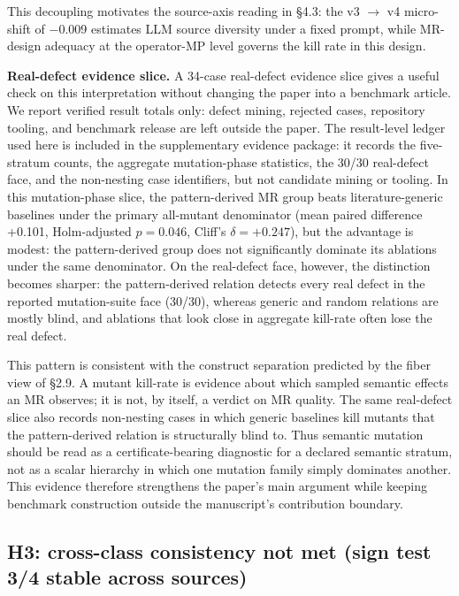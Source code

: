 \documentclass[acmsmall,screen,review]{acmart}
\begin{document}
This decoupling motivates the source-axis reading in §4.3: the v3 $\to$
v4 micro-shift of −0.009 estimates LLM source diversity under a fixed
prompt, while MR-design adequacy at the operator-MP level governs the
kill rate in this design.

\textbf{Real-defect evidence slice.} A 34-case real-defect evidence
slice gives a useful check on this interpretation without changing the
paper into a benchmark article. We report verified result totals only:
defect mining, rejected cases, repository tooling, and benchmark release
are left outside the paper. The result-level ledger used here is included
in the supplementary evidence package: it records the five-stratum counts,
the aggregate mutation-phase statistics, the 30/30 real-defect face, and
the non-nesting case identifiers, but not candidate mining or tooling. In
this mutation-phase slice, the
pattern-derived MR group beats
literature-generic baselines under the primary all-mutant denominator
(mean paired difference +0.101, Holm-adjusted \(p=0.046\), Cliff's
\(\delta=+0.247\)), but the advantage is modest: the pattern-derived
group does not significantly dominate its ablations under the same
denominator. On the real-defect face, however, the distinction becomes
sharper: the pattern-derived relation detects every real defect in the
reported mutation-suite face (30/30), whereas generic and random
relations are mostly blind, and ablations that look close in aggregate
kill-rate often lose the real defect.

This pattern is consistent with the construct separation predicted by the
fiber view of §2.9. A mutant kill-rate is evidence about which sampled
semantic effects an MR observes; it is not, by itself, a verdict on MR
quality. The same real-defect slice also records non-nesting cases in
which generic baselines kill mutants that the pattern-derived relation is
structurally blind to.
Thus semantic mutation should be read as a certificate-bearing diagnostic
for a declared semantic stratum, not as a scalar hierarchy in which one
mutation family simply dominates another. This evidence therefore
strengthens the paper's main argument while keeping benchmark construction
outside the manuscript's contribution boundary.

\subsection{H3: cross-class consistency not met (sign test 3/4 stable across sources)}\label{h4-partial-across-same-source-and-cross-source}
\end{document}
